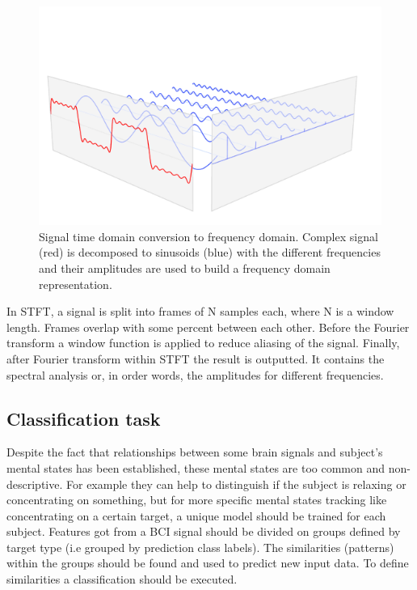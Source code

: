 \documentclass[12pt]{article}
\theoremstyle{definition}
\begin{document}
\begin{figure} [H]
\begin{center}
\includegraphics[width=1\textwidth]{fft}
\caption{Signal time domain conversion to frequency domain. \cite{fft} Complex signal (red) is decomposed to sinusoids (blue) with the different frequencies and their amplitudes are used to build a frequency domain representation. }
\end{center}
\end{figure}

In STFT, a signal is split into frames of N samples each, where N is a window length. Frames overlap with some percent between each other. Before the Fourier transform a window function is applied to reduce aliasing of the signal. Finally, after Fourier transform within STFT the result is outputted. It contains the spectral analysis or, in order words, the amplitudes for different frequencies.

\subsection{Classification task}

Despite the fact that relationships between some brain signals and subject's mental states has been established, these mental states are too common and non-descriptive. For example they can help to distinguish if the subject is relaxing or concentrating on something, but for more specific mental states tracking like concentrating on a certain target, a unique model should be trained for each subject. Features got from a BCI signal should be divided on groups defined by target type (i.e grouped by prediction class labels). The similarities (patterns) within the groups should be found and used to predict new input data. To define similarities a classification should be executed.
\end{document}
